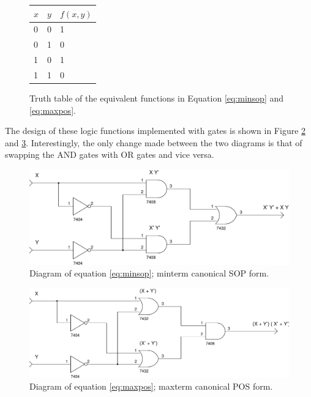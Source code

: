 \documentclass[12pt]{article}
\begin{document}
\begin{figure}[!hbt]
\center
\begin{tabular}[t]{| l | l | l |}
\hline
$x$ & $y$ & $f(x, y)$\\
\hline
0 & 0 & 1 \\
\hline
0 & 1 & 0 \\
\hline
1 & 0 & 1 \\
\hline
1 & 1 & 0 \\
\hline
\end{tabular}

\caption{Truth table of the equivalent functions in Equation \ref{eq:minsop} and \ref{eq:maxpos}.}
\label{fig:tt1}
\end{figure}

The design of these logic functions implemented with gates is shown
in Figure \ref{fig:minsoplog} and \ref{fig:maxposlog}.
Interestingly, the only change made between the two diagrams is
that of swapping the AND gates with OR gates and vice versa.

\begin{figure}[!hbtp]
\center
\includegraphics[scale=0.5]{minsop-01}
\caption{Diagram of equation \ref{eq:minsop}; minterm canonical SOP form.}
\label{fig:minsoplog}
\end{figure}

\begin{figure}[!hbtp]
\center
\includegraphics[scale=0.5]{maxpos-01}
\caption{Diagram of equation \ref{eq:maxpos}; maxterm canonical POS form.}
\label{fig:maxposlog}
\end{figure}
\end{document}
